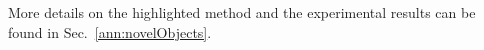 
More details on the highlighted method and the experimental results can be found in Sec.~\ref{ann:novelObjects}. %
